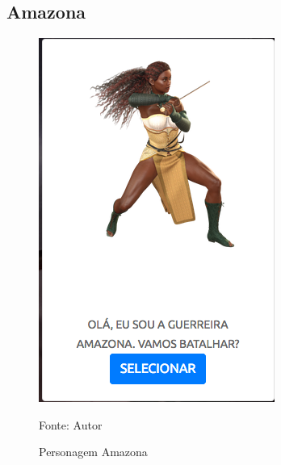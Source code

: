 \subsection{Amazona}
\begin{figure}[h]
	\centering
	\includegraphics[keepaspectratio=true,scale=0.5]{figuras/amazona.png}
	\caption{Personagem Amazona}
	Fonte: Autor
	\label{amazona}
\end{figure}

\clearpage

